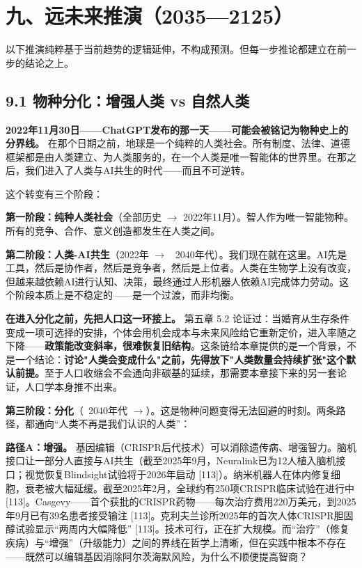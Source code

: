 \documentclass[11pt,a4paper]{ctexart}
\begin{document}
\section{九、远未来推演（2035—2125）}

以下推演纯粹基于当前趋势的逻辑延伸，不构成预测。但每一步推论都建立在前一步的结论之上。

\subsection{9.1 物种分化：增强人类 vs 自然人类}

\textbf{2022年11月30日——ChatGPT发布的那一天——可能会被铭记为物种史上的分界线。} 在那个日期之前，地球是一个纯粹的人类社会。所有制度、法律、道德框架都是由人类建立、为人类服务的，在一个人类是唯一智能体的世界里。在那之后，我们进入了人类与AI共生的时代——而且不可逆转。

这个转变有三个阶段：

\textbf{第一阶段：纯种人类社会}（全部历史 $\to$ 2022年11月）。智人作为唯一智能物种。所有的竞争、合作、意义创造都发生在人类之间。

\textbf{第二阶段：人类-AI共生}（2022年 $\to$ ~2040年代）。我们现在就在这里。AI先是工具，然后是协作者，然后是竞争者，然后是上位者。人类在生物学上没有改变，但越来越依赖AI进行认知、决策，最终通过人形机器人依赖AI完成体力劳动。这个阶段本质上是不稳定的——是一个过渡，而非均衡。

\textbf{在进入分化之前，先把人口这一环接上。} 第五章 5.2 论证过：当婚育从生存条件变成一项可选择的安排，个体会用机会成本与未来风险给它重新定价，进入率随之下降——\textbf{政策能改变斜率，很难恢复旧结构}。这条链给本章提供的是一个背景，不是一个结论：\textbf{讨论"人类会变成什么"之前，先得放下"人类数量会持续扩张"这个默认前提。}至于人口收缩会不会通向非碳基的延续，那需要本章接下来的另一套论证，人口学本身推不出来。

\textbf{第三阶段：分化}（~2040年代 $\to$）。这是物种问题变得无法回避的时刻。两条路径，都通向“人类不再是我们认识的人类”：

\textbf{路径A：增强。} 基因编辑（CRISPR后代技术）可以消除遗传病、增强智力。脑机接口让一部分人直接与AI共生（截至2025年9月，Neuralink已为12人植入脑机接口；视觉恢复Blindsight试验将于2026年启动 [113]）。纳米机器人在体内修复细胞，衰老被大幅延缓。截至2025年2月，全球约有250项CRISPR临床试验在进行中 [113]。Casgevy——首个获批的CRISPR药物——每次治疗费用220万美元，到2025年9月已有39名患者接受输注 [113]。克利夫兰诊所2025年的首次人体CRISPR胆固醇试验显示“两周内大幅降低” [113]。技术可行，正在扩大规模。而“治疗”（修复疾病）与“增强”（升级能力）之间的界线在哲学上清晰，但在实践中根本不存在——既然可以编辑基因消除阿尔茨海默风险，为什么不顺便提高智商？
\end{document}

